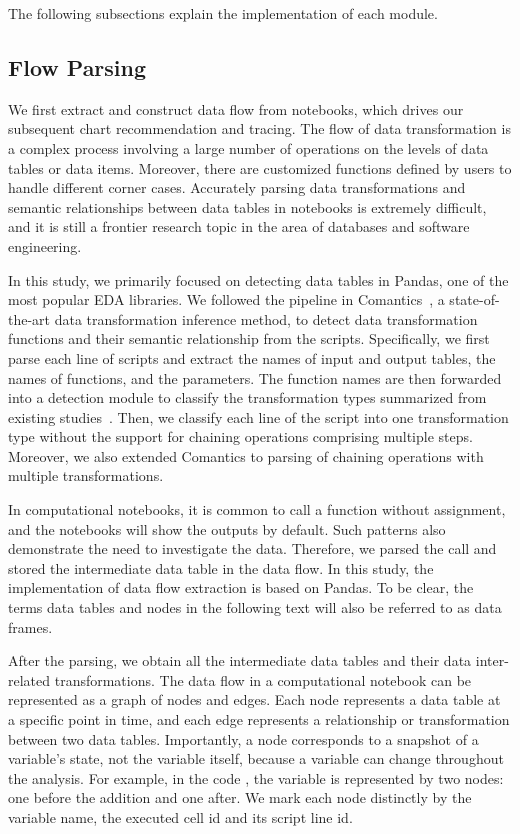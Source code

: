 The following subsections explain the implementation of each module.

\subsection{Flow Parsing}
We first extract and construct data flow from notebooks, which drives our subsequent chart recommendation and tracing.
The flow of data transformation is a complex process involving a large number of operations on the levels of data tables or data items.
Moreover, there are customized functions defined by users to handle different corner cases.
Accurately parsing data transformations and semantic relationships between data tables in notebooks is extremely difficult, and it is still a frontier research topic in the area of databases and software engineering.

In this study, we primarily focused on detecting data tables in Pandas, one of the most popular EDA libraries. 
We followed the pipeline in Comantics~\cite{comantics}, a state-of-the-art data transformation inference method, to detect data transformation functions and their semantic relationship from the scripts.
Specifically, we first parse each line of scripts and extract the names of input and output tables, the names of functions, and the parameters.
The function names are then forwarded into a detection module to classify the transformation types summarized from existing studies~\cite{proactive, tablescraps}.
Then, we classify each line of the script into one transformation type without the support for chaining operations comprising multiple steps.
Moreover, we also extended Comantics to parsing of chaining operations with multiple transformations.

In computational notebooks, it is common to call a function without assignment, and the notebooks will show the outputs by default.
Such patterns also demonstrate the need to investigate the data.
Therefore, we parsed the call and stored the intermediate data table in the data flow.
In this study, the implementation of data flow extraction is based on Pandas.
To be clear, the terms data tables and nodes in the following text will also be referred to as data frames.

After the parsing, we obtain all the intermediate data tables and their data inter-related transformations.
The data flow in a computational notebook can be represented as a graph of nodes and edges. 
Each node represents a data table at a specific point in time, and each edge represents a relationship or transformation between two data tables. Importantly, a node corresponds to a snapshot of a variable's state, not the variable itself, because a variable can change throughout the analysis. For example, in the code , the variable  is represented by two nodes: one before the addition and one after.
We mark each node distinctly by the variable name, the executed cell id and its script line id. 



